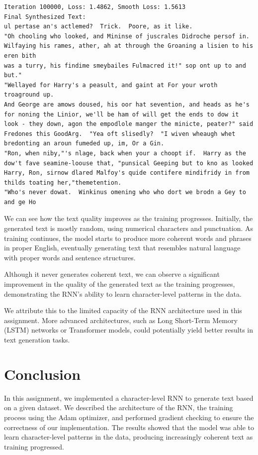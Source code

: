 \documentclass{article}
\begin{document}
\begin{verbatim}
Iteration 100000, Loss: 1.4862, Smooth Loss: 1.5613
Final Synthesized Text:
ul pertase an's actlemed?  Trick.  Poore, as it like.
"Oh chooling who looked, and Mininse of juscrales Didroche persof in. 
Wilfaying his rames, ather, ah at through the Groaning a lisien to his eren bith 
was a turry, his findime smeybailes Fulmacred it!" sop ont up to and but."
"Wellayed for Harry's a peasult, and gaint at For your wroth troaground up.
And George are amows doused, his oor hat sevention, and heads as he's for noning the Linior, we'll be ham of will get the ends to dow it look - they down, agon the empodlole manger the minicte, peater?" said Fredones this GoodArg.  "Yea oft slisedly?  "I wiven wheaugh whet bredonting an aroun fumeded up, im, Or a Gin.
"Ron, when niby,"'s nlage, back when your a choopt if.  Harry as the dow't fave seamine-loouse that, "punsical Geeping but to kno as looked Harry, Ron, sirnow dlared Malfoy's quide contifere mindifridy in from thilds toating her,"themetention.
"Who's never dowat.  Winkinus omening who who dort we brodn a Gey to and ge Ho
\end{verbatim}

We can see how the text quality improves as the training progresses. Initially, the generated text is mostly random, using numerical characters and punctuation. As training continues, the model starts to produce more coherent words and phrases in proper English, eventually generating text that resembles natural language with proper words and sentence structures.

Although it never generates coherent text, we can observe a significant improvement in the quality of the generated text as the training progresses, demonstrating the RNN's ability to learn character-level patterns in the data.

We attribute this to the limited capacity of the RNN architecture used in this assignment. More advanced architectures, such as Long Short-Term Memory (LSTM) networks or Transformer models, could potentially yield better results in text generation tasks.


\section{Conclusion}
In this assignment, we implemented a character-level RNN to generate text based on a given dataset. We described the architecture of the RNN, the training process using the Adam optimizer, and performed gradient checking to ensure the correctness of our implementation. The results showed that the model was able to learn character-level patterns in the data, producing increasingly coherent text as training progressed.
\end{document}
